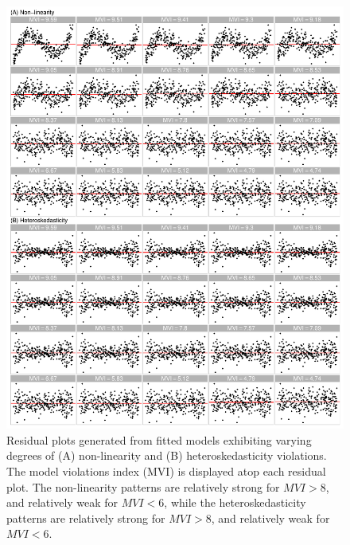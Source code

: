 \documentclass[]{interact}
\theoremstyle{plain}%
\theoremstyle{definition}
\theoremstyle{remark}
\begin{document}
\begin{figure}[!h]

{\centering \includegraphics[width=1\linewidth]{appendix_files/figure-latex/poly-heter-index-1} 

}

\caption{Residual plots generated from fitted models exhibiting varying degrees of (A) non-linearity and (B) heteroskedasticity violations. The model violations index (MVI) is displayed atop each residual plot. The non-linearity patterns are relatively strong for $MVI > 8$, and relatively weak for $MVI < 6$, while the heteroskedasticity patterns are relatively strong for $MVI > 8$, and relatively weak for $MVI < 6$.}\label{fig:poly-heter-index}
\end{figure}

\clearpage



\end{document}
